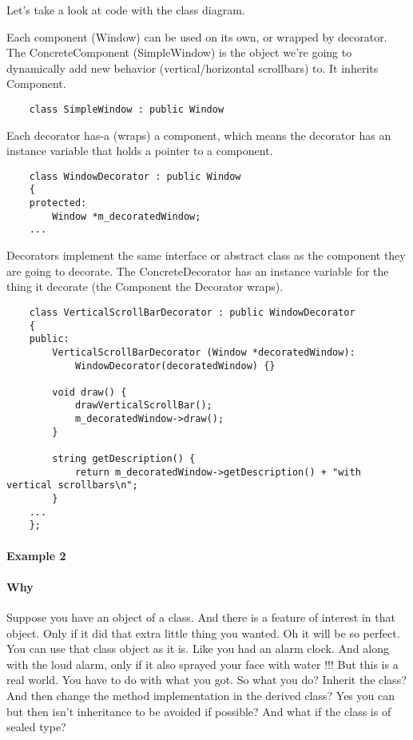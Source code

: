 \documentclass{book}
\begin{document}
Let's take a look at code with the class diagram.

    Each component (Window) can be used on its own, or wrapped by decorator.
    The ConcreteComponent (SimpleWindow) is the object we're going to dynamically add new behavior (vertical/horizontal scrollbars) to. It inherits Component.

\begin{verbatim}
    class SimpleWindow : public Window
\end{verbatim}
    Each decorator has-a (wraps) a component, which means the decorator has an instance variable that holds a pointer to a component.

\begin{verbatim}
    class WindowDecorator : public Window 
    {
    protected:
    	Window *m_decoratedWindow; 
    ...
\end{verbatim}
    Decorators implement the same interface or abstract class as the component they are going to decorate.
    The ConcreteDecorator has an instance variable for the thing it decorate (the Component the Decorator wraps).

\begin{verbatim}
    class VerticalScrollBarDecorator : public WindowDecorator 
    {
    public:
    	VerticalScrollBarDecorator (Window *decoratedWindow): 
    		WindowDecorator(decoratedWindow) {}
     
    	void draw() {
            drawVerticalScrollBar();
            m_decoratedWindow->draw();
        }
     
        string getDescription() {
            return m_decoratedWindow->getDescription() + "with vertical scrollbars\n";
        }
    ...
    };
\end{verbatim}

\paragraph{Example 2}\mbox{}
\paragraph{Why}
Suppose you have an object of a class.
And there is a feature of interest in that object.
Only if it did that extra little thing you wanted.
Oh it will be so perfect.
You can use that class object as it is.
Like you had an alarm clock. And along with the loud alarm, only if it also sprayed your face with water !!!
But this is a real world. You have to do with what you got.
So what you do? Inherit the class? And then change the method implementation in the derived class?
Yes you can but then isn’t inheritance to be avoided if possible? And what if the class is of sealed type?
\end{document}
